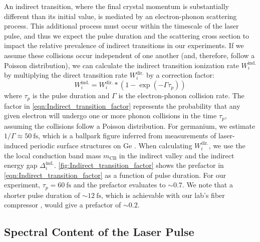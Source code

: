 An indirect transition, where the final crystal momentum is substantially different than its initial value, is mediated by an electron-phonon scattering process. This additional process must occur within the timescale of the laser pulse, and thus we expect the pulse duration and the scattering cross section to impact the relative prevalence of indirect transitions in our experiments. If we assume these collisions occur independent of one another (and, therefore, follow a Poisson distribution), we can calculate the indirect transition ionization rate $W_i^{\textrm{ind.}}$ by multiplying the direct transition rate $W_i^{\textrm{dir.}}$ by a correction factor:
\begin{equation}
W_i^{\textrm{ind.}} = W_i^{\textrm{dir.}} * (1 - \exp(-\Gamma \tau_p))
\label{eqn:Indirect_transition_factor}
\end{equation}
where $\tau_p$ is the pulse duration and $\Gamma$ is the electron-phonon collision rate. The factor in \cref{eqn:Indirect_transition_factor} represents the probability that any given electron will undergo one or more phonon collisions in the time $\tau_p$, assuming the collisions follow a Poisson distribution. For germanium, we estimate $1/\Gamma \approx 50 \ \textrm{fs}$, which is a ballpark figure inferred from measurements of laser-induced periodic surface structures on Ge \cite{austinSemiconductorSurfaceModification2017}. When calculating $W_i^{\textrm{dir.}}$, we use the the local conduction band mass $m_{\textrm{CB}}$ in the indirect valley and the indirect energy gap $\Delta_i^{\textrm{ind.}}$. \cref{fig:Indirect_transition_factor} shows the prefactor in \cref{eqn:Indirect_transition_factor} as a function of pulse duration. For our experiment, $\tau_p = 60 \ \textrm{fs}$ and the prefactor evaluates to $\sim 0.7$. We note that a shorter pulse duration of $\sim 12 \ \textrm{fs}$, which is achievable with our lab's fiber compressor \cite{zhangAtomicMolecularDynamics2015}, would give a prefactor of $\sim 0.2$.

\subsection{Spectral Content of the Laser Pulse}
\label{sec:bandwidth_of_pulse}

